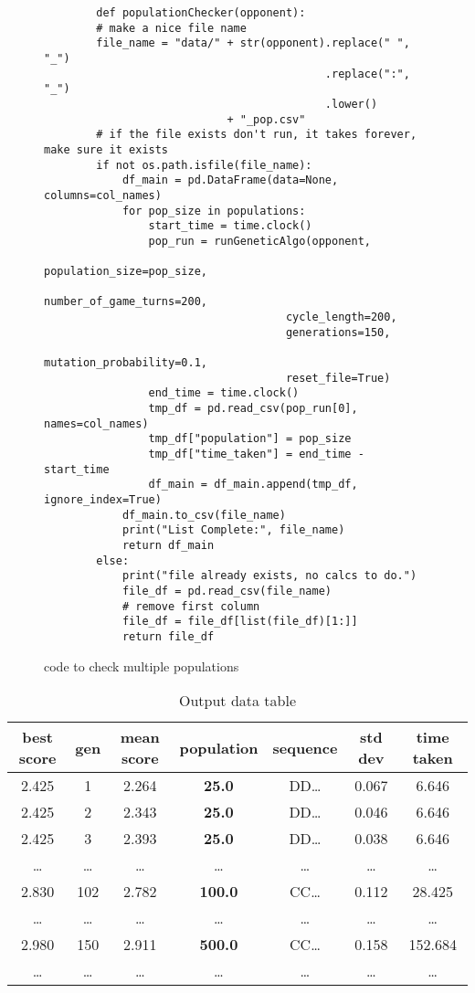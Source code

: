 \begin{figure}[ht] 
    \begin{verbatim}
        def populationChecker(opponent):
        # make a nice file name
        file_name = "data/" + str(opponent).replace(" ", "_")
                                           .replace(":", "_")
                                           .lower() 
                            + "_pop.csv"
        # if the file exists don't run, it takes forever, make sure it exists 
        if not os.path.isfile(file_name):
            df_main = pd.DataFrame(data=None, columns=col_names)
            for pop_size in populations:
                start_time = time.clock()
                pop_run = runGeneticAlgo(opponent,
                                     population_size=pop_size,
                                     number_of_game_turns=200,
                                     cycle_length=200,
                                     generations=150,
                                     mutation_probability=0.1,
                                     reset_file=True)
                end_time = time.clock()
                tmp_df = pd.read_csv(pop_run[0], names=col_names)
                tmp_df["population"] = pop_size
                tmp_df["time_taken"] = end_time - start_time
                df_main = df_main.append(tmp_df, ignore_index=True)
            df_main.to_csv(file_name)
            print("List Complete:", file_name)
            return df_main
        else:
            print("file already exists, no calcs to do.")
            file_df = pd.read_csv(file_name)
            # remove first column
            file_df = file_df[list(file_df)[1:]]
            return file_df
    \end{verbatim}
    \caption{code to check multiple populations}\label{code:populationChecker}
\end{figure}

\begin{table*}
    \centering
    \begin{tabular}{ccccccc}
        \toprule
        best score & gen & mean score & population & sequence & std dev & time taken \\
        \midrule
        2.425 & 1 & 2.264 & \textbf{25.0} & DD\ldots & 0.067 & 6.646\\
        2.425 & 2 & 2.343 & \textbf{25.0} & DD\ldots & 0.046 & 6.646\\
        2.425 & 3 & 2.393 & \textbf{25.0} & DD\ldots & 0.038 & 6.646\\
        \ldots  & \ldots  & \ldots  & \ldots  & \ldots  & \ldots  & \ldots \\
        2.830 & 102 & 2.782 & \textbf{100.0} & CC\ldots & 0.112 & 28.425\\
        \ldots  & \ldots  & \ldots  & \ldots  & \ldots  & \ldots  & \ldots \\
        2.980 & 150 & 2.911 & \textbf{500.0} & CC\ldots & 0.158 & 152.684\\
        \ldots  & \ldots  & \ldots  & \ldots  & \ldots  & \ldots  & \ldots \\
        \bottomrule
    \end{tabular}
    \caption{Output data table}\label{table:popCheckerDataTable}
\end{table*}

